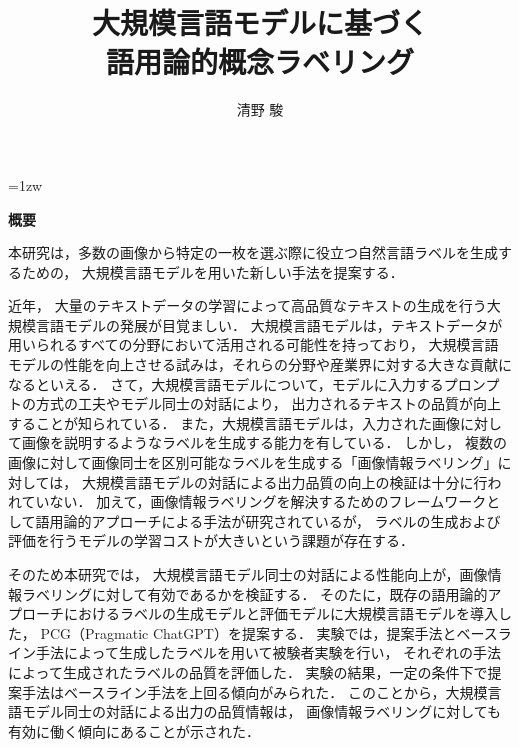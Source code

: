 \documentclass[a4paper,11pt]{jreport}
\title{大規模言語モデルに基づく\\語用論的概念ラベリング}
\author{清野 駿}
\begin{document}
\maketitle
\thispagestyle{empty}
\newpage

\thispagestyle{empty}
\vspace*{20pt plus 1fil}
\parindent=1zw
\noindent
\begin{center}
{\bf 概要}
\vspace{5mm}
\end{center}
本研究は，多数の画像から特定の一枚を選ぶ際に役立つ自然言語ラベルを生成するための，
大規模言語モデルを用いた新しい手法を提案する．

近年，
大量のテキストデータの学習によって高品質なテキストの生成を行う大規模言語モデルの発展が目覚ましい．
大規模言語モデルは，テキストデータが用いられるすべての分野において活用される可能性を持っており，
大規模言語モデルの性能を向上させる試みは，それらの分野や産業界に対する大きな貢献になるといえる．
さて，大規模言語モデルについて，モデルに入力するプロンプトの方式の工夫やモデル同士の対話により，
出力されるテキストの品質が向上することが知られている．
また，大規模言語モデルは，入力された画像に対して画像を説明するようなラベルを生成する能力を有している．
しかし，
複数の画像に対して画像同士を区別可能なラベルを生成する「画像情報ラベリング」に対しては，
大規模言語モデルの対話による出力品質の向上の検証は十分に行われていない．
加えて，画像情報ラベリングを解決するためのフレームワークとして語用論的アプローチによる手法が研究されているが，
ラベルの生成および評価を行うモデルの学習コストが大きいという課題が存在する．

そのため本研究では，
大規模言語モデル同士の対話による性能向上が，画像情報ラベリングに対して有効であるかを検証する．
そのたに，既存の語用論的アプローチにおけるラベルの生成モデルと評価モデルに大規模言語モデルを導入した，
PCG（Pragmatic ChatGPT）を提案する．
実験では，提案手法とベースライン手法によって生成したラベルを用いて被験者実験を行い，
それぞれの手法によって生成されたラベルの品質を評価した．
実験の結果，一定の条件下で提案手法はベースライン手法を上回る傾向がみられた．
このことから，大規模言語モデル同士の対話による出力の品質情報は，
画像情報ラベリングに対しても有効に働く傾向にあることが示された．

\par
\vspace{0pt plus 1fil}
\newpage

\tableofcontents
\listoffigures
\end{document}
